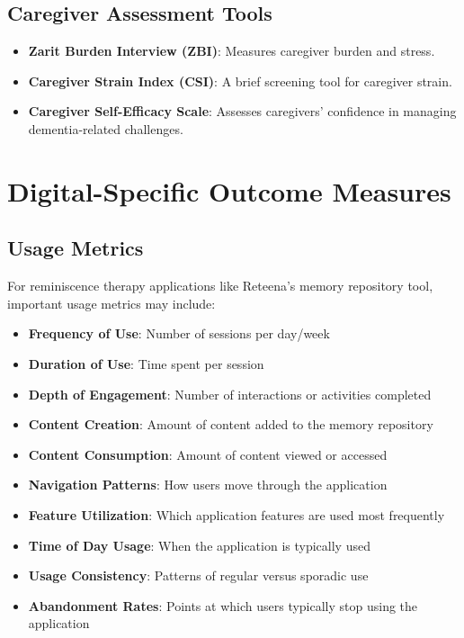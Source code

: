 \subsection{Caregiver Assessment Tools}
\begin{itemize}
    \item \textbf{Zarit Burden Interview (ZBI)}: Measures caregiver burden and stress.
    
    \item \textbf{Caregiver Strain Index (CSI)}: A brief screening tool for caregiver strain.
    
    \item \textbf{Caregiver Self-Efficacy Scale}: Assesses caregivers' confidence in managing dementia-related challenges.
\end{itemize}

\section{Digital-Specific Outcome Measures}
\subsection{Usage Metrics}
\begin{tcolorbox}[infobox, title=Digital Metrics for Reminiscence Therapy Applications]
For reminiscence therapy applications like Reteena's memory repository tool, important usage metrics may include:
\begin{itemize}
    \item \textbf{Frequency of Use}: Number of sessions per day/week
    \item \textbf{Duration of Use}: Time spent per session
    \item \textbf{Depth of Engagement}: Number of interactions or activities completed
    \item \textbf{Content Creation}: Amount of content added to the memory repository
    \item \textbf{Content Consumption}: Amount of content viewed or accessed
    \item \textbf{Navigation Patterns}: How users move through the application
    \item \textbf{Feature Utilization}: Which application features are used most frequently
    \item \textbf{Time of Day Usage}: When the application is typically used
    \item \textbf{Usage Consistency}: Patterns of regular versus sporadic use
    \item \textbf{Abandonment Rates}: Points at which users typically stop using the application
\end{itemize}
\end{tcolorbox}

